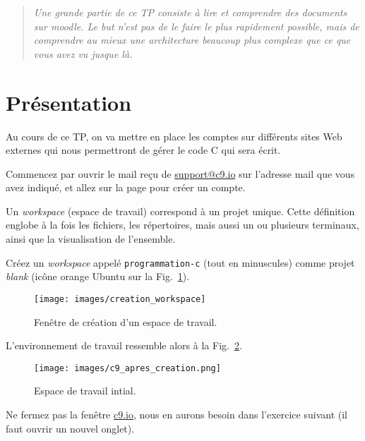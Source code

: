 \titre{\tgit}

\begin{quotation}
  \sl Une grande partie de ce TP consiste à lire et comprendre des
  documents sur moodle. Le but n'est pas de le faire le plus
  rapidement possible, mais de comprendre au mieux une architecture
  beaucoup plus complexe que ce que vous avez vu jusque là.
\end{quotation}

\section*{Présentation}

Au cours de ce TP, on va mettre en place les comptes sur différents
sites Web externes qui nous permettront de gérer le code C qui sera
écrit.


\question Commencez par ouvrir le mail reçu de \url{support@c9.io} sur
l'adresse mail que vous avez indiqué, et allez sur la page pour créer
un compte.


Un \emph{workspace} (espace de travail) correspond à un projet
unique. Cette définition englobe à la fois les fichiers, les
répertoires, mais aussi un ou plusieurs terminaux, ainsi que la
visualisation de l'ensemble. 

\question Créez un \emph{workspace} appelé \texttt{programmation-c} (tout
en minuscules) comme projet \emph{blank} (icône orange Ubuntu
sur la Fig.~\ref{fig:workspace:creation}).

\begin{figure}[htbp]
  \centering
  \texttt{[image: images/creation\_workspace]}
  \caption{Fenêtre de création d'un espace de travail.}
  \label{fig:workspace:creation}
\end{figure}

L'environnement de travail ressemble alors à la Fig.~\ref{fig:workspace:initial}.

\begin{figure}[htbp]
  \centering
  \texttt{[image: images/c9\_apres\_creation.png]}
  \caption{Espace de travail intial.}
  \label{fig:workspace:initial}
\end{figure}

\begin{fminipage}{0.9\textwidth}
  Ne fermez pas la fenêtre \url{c9.io}, nous en aurons besoin dans
  l'exercice suivant (il faut ouvrir un nouvel onglet).
\end{fminipage}

